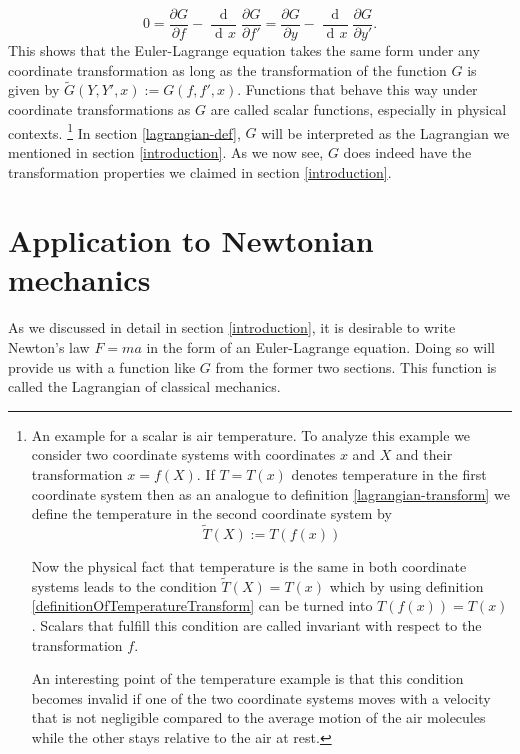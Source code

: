 \documentclass[prb,preprint]{revtex4-1}
\DeclareMathOperator{\dd}{d\!}
\DeclareMathOperator{\ddd}{\mathrm{d}}
\begin{document}
\begin{equation}
0 = \frac{\partial G}{\partial f} - \frac{\ddd}{\dd x} \frac{\partial G}{\partial f'}
= \frac{\partial G}{\partial y} - \frac{\ddd}{\dd x} \frac{\partial G}{\partial y'}.
\end{equation}
This shows that the Euler-Lagrange equation takes the same form under any coordinate transformation as long as the transformation of the function $G$ is given by $\widetilde{G}(Y,Y',x) := G(f,f',x)$. Functions that behave this way under coordinate transformations as $G$ are called scalar functions, especially in physical contexts.
\footnote{An example for a scalar is air temperature.
To analyze this example we consider two coordinate systems with coordinates $x$ and $X$ and their transformation $x=f(X)$.
If $T=T(x)$ denotes temperature in the first coordinate system then as an analogue to definition \ref{lagrangian-transform} we define the temperature in the second coordinate system by
\begin{equation} \label{definitionOfTemperatureTransform}
  \tilde{T}(X) := T(f(x))
\end{equation}

Now the physical fact that temperature is the same in both coordinate systems leads to the condition $\tilde{T}(X) = T(x)$ which by using definition \ref{definitionOfTemperatureTransform} can be turned into $T(f(x)) = T(x)$.
Scalars that fulfill this condition are called invariant with respect to the transformation $f$.

An interesting point of the temperature example is that this condition becomes invalid if one of the two coordinate systems moves with a velocity that is not negligible compared to the average motion of the air molecules while the other stays relative to the air at rest.
}
In section \ref{lagrangian-def}, $G$ will be interpreted as the Lagrangian we mentioned in section \ref{introduction}. As we now see, $G$ does indeed have the transformation properties we claimed in section \ref{introduction}.

\section{Application to Newtonian mechanics} \label{application}
As we discussed in detail in section \ref{introduction}, it is desirable to write Newton's law $F=ma$ in the form of an Euler-Lagrange equation. Doing so will provide us with a function like $G$ from the former two sections. This function is called the Lagrangian of classical mechanics.
\end{document}
